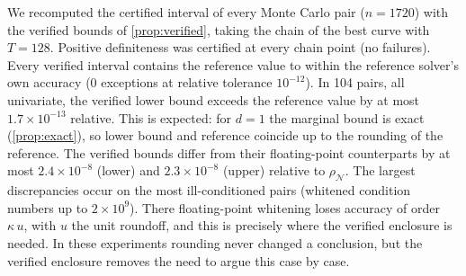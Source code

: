We recomputed the certified interval of every Monte Carlo pair ($n=1720$) with the verified bounds of \cref{prop:verified}, taking the chain of the best curve with $T=128$. Positive definiteness was certified at every chain point (no failures). Every verified interval contains the reference value to within the reference solver's own accuracy (0 exceptions at relative tolerance $10^{-12}$). In 104 pairs, all univariate, the verified lower bound exceeds the reference value by at most $1.7\times10^{-13}$ relative. This is expected: for $d=1$ the marginal bound is exact (\cref{prop:exact}), so lower bound and reference coincide up to the rounding of the reference. The verified bounds differ from their floating-point counterparts by at most $2.4\times10^{-8}$ (lower) and $2.3\times10^{-8}$ (upper) relative to $\rho_\mathcal{N}$. The largest discrepancies occur on the most ill-conditioned pairs (whitened condition numbers up to $2\times10^9$). There floating-point whitening loses accuracy of order $\kappa\,u$, with $u$ the unit roundoff, and this is precisely where the verified enclosure is needed. In these experiments rounding never changed a conclusion, but the verified enclosure removes the need to argue this case by case.